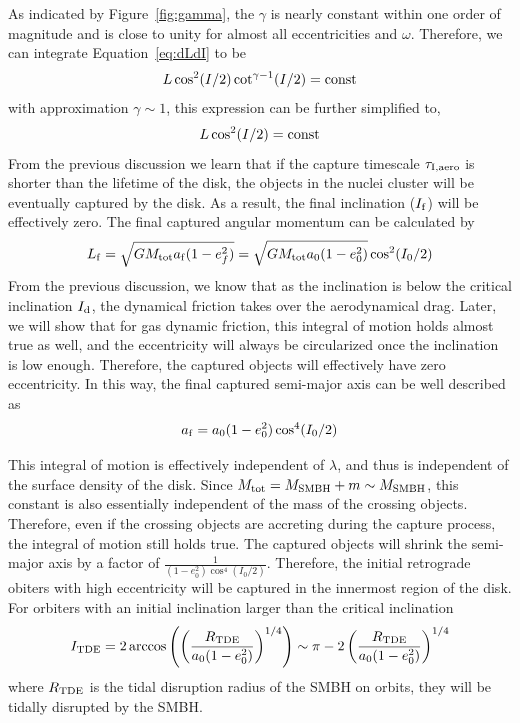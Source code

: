 \documentclass[fleqn,usenatbib]{mnras}
\begin{document}
As indicated by Figure~\ref{fig:gamma}, the $\gamma$ is nearly constant within one order of magnitude and is close to unity for almost all eccentricities and $\omega$. Therefore, we can integrate Equation~\ref{eq:dLdI} to be
\begin{eqnarray}
L\cos^2(I/2)\cot^{\gamma-1}(I/2)=\rm const \label{eq:LI}
\end{eqnarray}
with approximation $\gamma\sim1$, this expression can be further simplified to,
\begin{eqnarray}
L\cos^2(I/2)=\rm const
\end{eqnarray}
From the previous discussion we learn that if the capture timescale $\tau_{\rm I, aero}$ is shorter than the lifetime of the disk, the objects in the nuclei cluster will be eventually captured by the disk. As a result, the final inclination ($I_{\rm f}$) will be effectively zero. The final captured angular momentum can be calculated by
 \begin{equation}
 L_{\rm f} = \sqrt{GM_{\rm tot}a_{\rm f}(1-e_f^2)} = \sqrt{GM_{\rm tot}a_0(1-e_0^2)}\cos^2(I_0/2)
 \end{equation}
From the previous discussion, we know that as the inclination is below the critical inclination $I_{\rm d}$, the dynamical friction takes over the aerodynamical drag. Later, we will show that for gas dynamic friction, this integral of motion holds almost true as well, and the eccentricity will always be circularized once the inclination is low enough. Therefore, the captured objects will effectively have zero eccentricity. In this way, the final captured semi-major axis can be well described as
\begin{eqnarray}
a_{\rm f} = a_0(1-e^2_0)\cos^4(I_0/2)
\end{eqnarray}

This integral of motion is effectively independent of $\lambda$, and thus is independent of the surface density of the disk. Since $M_{\rm tot}=M_{\rm SMBH}+m\sim M_{\rm SMBH}$, this constant is also essentially independent of the mass of the crossing objects. Therefore, even if the crossing objects are accreting during the capture process, the integral of motion still holds true. The captured objects will shrink the semi-major axis by a factor of $\frac{1}{(1-e_0^2)\cos^4(I_0/2)}$. Therefore, the initial retrograde obiters with high eccentricity will be captured in the innermost region of the disk. For orbiters with an initial inclination larger than the critical inclination
\begin{eqnarray}
I_{\rm TDE} = 2\arccos\left(\left(\frac{R_{\rm TDE}}{a_0(1-e_0^2)}\right)^{1/4}\right)\sim \pi-2\left(\frac{R_{\rm TDE}}{a_0(1-e_0^2)}\right)^{1/4}
\end{eqnarray}
where $R_{\rm TDE}$ is the tidal disruption radius of the SMBH on orbits, they will be tidally disrupted by the SMBH.
\end{document}
